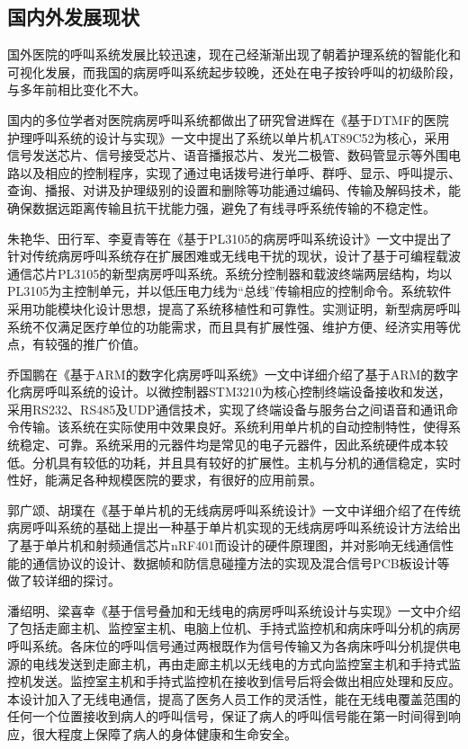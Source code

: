 \subsection{国内外发展现状}
国外医院的呼叫系统发展比较迅速，现在己经渐渐出现了朝着护理系统的智能化和可视化发展，而我国的病房呼叫系统起步较晚，还处在电子按铃呼叫的初级阶段，与多年前相比变化不大。

国内的多位学者对医院病房呼叫系统都做出了研究曾进辉在《基于DTMF的医院护理呼叫系统的设计与实现》一文中提出了系统以单片机AT89C52为核心，采用信号发送芯片、信号接受芯片、语音播报芯片、发光二极管、数码管显示等外围电路以及相应的控制程序，实现了通过电话拨号进行单呼、群呼、显示、呼叫提示、查询、播报、对讲及护理级别的设置和删除等功能通过编码、传输及解码技术，能确保数据远距离传输且抗干扰能力强，避免了有线寻呼系统传输的不稳定性。

朱艳华、田行军、李夏青等在《基于PL3105的病房呼叫系统设计》一文中提出了针对传统病房呼叫系统存在扩展困难或无线电干扰的现状，设计了基于可编程载波通信芯片PL3105的新型病房呼叫系统。系统分控制器和载波终端两层结构，均以PL3105为主控制单元，并以低压电力线为“总线”传输相应的控制命令。系统软件采用功能模块化设计思想，提高了系统移植性和可靠性。实测证明，新型病房呼叫系统不仅满足医疗单位的功能需求，而且具有扩展性强、维护方便、经济实用等优点，有较强的推广价值。

乔国鹏在《基于ARM的数字化病房呼叫系统》一文中详细介绍了基于ARM的数字化病房呼叫系统的设计。以微控制器STM3210为核心控制终端设备接收和发送，采用RS232、RS485及UDP通信技术，实现了终端设备与服务台之间语音和通讯命令传输。该系统在实际使用中效果良好。系统利用单片机的自动控制特性，使得系统稳定、可靠。系统采用的元器件均是常见的电子元器件，因此系统硬件成本较低。分机具有较低的功耗，并且具有较好的扩展性。主机与分机的通信稳定，实时性好，能满足各种规模医院的要求，有很好的应用前景。

郭广颂、胡璞在《基于单片机的无线病房呼叫系统设计》一文中详细介绍了在传统病房呼叫系统的基础上提出一种基于单片机实现的无线病房呼叫系统设计方法给出了基于单片机和射频通信芯片nRF401而设计的硬件原理图，并对影响无线通信性能的通信协议的设计、数据帧和防信息碰撞方法的实现及混合信号PCB板设计等做了较详细的探讨。

潘绍明、梁喜幸《基于信号叠加和无线电的病房呼叫系统设计与实现》一文中介绍了包括走廊主机、监控室主机、电脑上位机、手持式监控机和病床呼叫分机的病房呼叫系统。各床位的呼叫信号通过两根既作为信号传输又为各病床呼叫分机提供电源的电线发送到走廊主机，再由走廊主机以无线电的方式向监控室主机和手持式监控机发送。监控室主机和手持式监控机在接收到信号后将会做出相应处理和反应。本设计加入了无线电通信，提高了医务人员工作的灵活性，能在无线电覆盖范围的任何一个位置接收到病人的呼叫信号，保证了病人的呼叫信号能在第一时间得到响应，很大程度上保障了病人的身体健康和生命安全。

